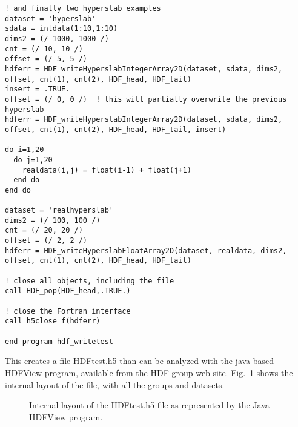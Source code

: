 \documentclass[DIV=calc, paper=letter, fontsize=11pt]{scrartcl}	 %
\begin{document}
{\begin{verbatim}
! and finally two hyperslab examples
dataset = 'hyperslab'
sdata = intdata(1:10,1:10)
dims2 = (/ 1000, 1000 /)
cnt = (/ 10, 10 /)
offset = (/ 5, 5 /)
hdferr = HDF_writeHyperslabIntegerArray2D(dataset, sdata, dims2, offset, cnt(1), cnt(2), HDF_head, HDF_tail)
insert = .TRUE.
offset = (/ 0, 0 /)  ! this will partially overwrite the previous hyperslab
hdferr = HDF_writeHyperslabIntegerArray2D(dataset, sdata, dims2, offset, cnt(1), cnt(2), HDF_head, HDF_tail, insert)

do i=1,20
  do j=1,20
    realdata(i,j) = float(i-1) + float(j+1)
  end do
end do

dataset = 'realhyperslab'
dims2 = (/ 100, 100 /)
cnt = (/ 20, 20 /)
offset = (/ 2, 2 /)
hdferr = HDF_writeHyperslabFloatArray2D(dataset, realdata, dims2, offset, cnt(1), cnt(2), HDF_head, HDF_tail)

! close all objects, including the file
call HDF_pop(HDF_head,.TRUE.)

! close the Fortran interface
call h5close_f(hdferr)

end program hdf_writetest
\end{verbatim}}

This creates a file \textsf{HDFtest.h5} than can be analyzed with the java-based \textsf{HDFView} program, available
from the HDF group web site.  Fig.~\ref{fig:HDFView} shows the internal layout of the file, with all the groups and
datasets.

\newpage
\begin{figure}[h]
\leavevmode\centering
\epsfysize=6in
\caption{\label{fig:HDFView}Internal layout of the \textsf{HDFtest.h5} file as represented by the Java \textsf{HDFView} program.}
\end{figure}
\end{document}
